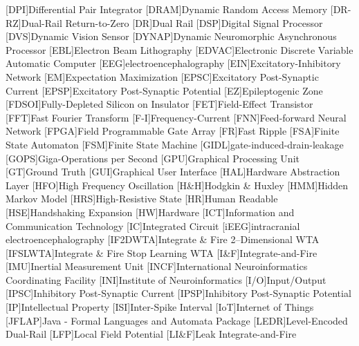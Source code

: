 [DPI]{Differential Pair Integrator}
[DRAM]{Dynamic Random Access Memory}
[DR-RZ]{Dual-Rail Return-to-Zero}
[DR]{Dual Rail}
[DSP]{Digital Signal Processor}
[DVS]{Dynamic Vision Sensor}
[DYNAP]{Dynamic Neuromorphic Asynchronous Processor}
[EBL]{Electron Beam Lithography}
[EDVAC]{Electronic Discrete Variable Automatic Computer}
[EEG]{electroencephalography}
[EIN]{Excitatory-Inhibitory Network}
[EM]{Expectation Maximization}
[EPSC]{Excitatory Post-Synaptic Current}
[EPSP]{Excitatory Post-Synaptic Potential}
[EZ]{Epileptogenic Zone}
[FDSOI]{Fully-Depleted Silicon on Insulator}
[FET]{Field-Effect Transistor}
[FFT]{Fast Fourier Transform}
[F-I]{Frequency-Current}
[FNN]{Feed-forward Neural Network}
[FPGA]{Field Programmable Gate Array}
[FR]{Fast Ripple}
[FSA]{Finite State Automaton}
[FSM]{Finite State Machine}
[GIDL]{gate-induced-drain-leakage}
[GOPS]{Giga-Operations per Second}
[GPU]{Graphical Processing Unit}
[GT]{Ground Truth}
[GUI]{Graphical User Interface}
[HAL]{Hardware Abstraction Layer}
[HFO]{High Frequency Oscillation}
[H\&H]{Hodgkin \& Huxley}
[HMM]{Hidden Markov Model}
[HRS]{High-Resistive State}
[HR]{Human Readable}
[HSE]{Handshaking Expansion}
[HW]{Hardware}
[ICT]{Information and Communication Technology}
[IC]{Integrated Circuit}
[iEEG]{intracranial electroencephalography}
[IF2DWTA]{Integrate \& Fire 2--Dimensional WTA}
[IFSLWTA]{Integrate \& Fire Stop Learning WTA}
[I\&F]{Integrate-and-Fire}
[IMU]{Inertial Measurement Unit}
[INCF]{International Neuroinformatics Coordinating Facility}
[INI]{Institute of Neuroinformatics}
[I/O]{Input/Output}
[IPSC]{Inhibitory Post-Synaptic Current}
[IPSP]{Inhibitory Post-Synaptic Potential}
[IP]{Intellectual Property}
[ISI]{Inter-Spike Interval}
[IoT]{Internet of Things}
[JFLAP]{Java - Formal Languages and Automata Package}
[LEDR]{Level-Encoded Dual-Rail}
[LFP]{Local Field Potential}
[LI\&F]{Leak Integrate-and-Fire}
